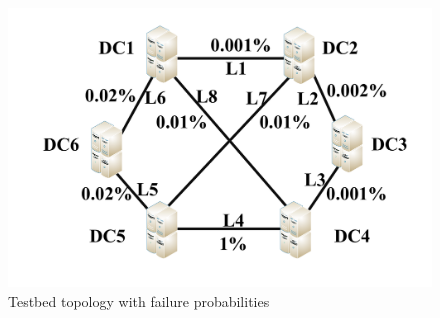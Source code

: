 \documentclass[sigconf]{acmart}
\begin{document}
 \begin{figure}
\begin{center}
\includegraphics [width=0.8\columnwidth] {fig/testbed.pdf}
\caption{Testbed topology with failure probabilities}
\label{testbed}
\end{center}
\end{figure}
%
%
%
%
%
\end{document}

